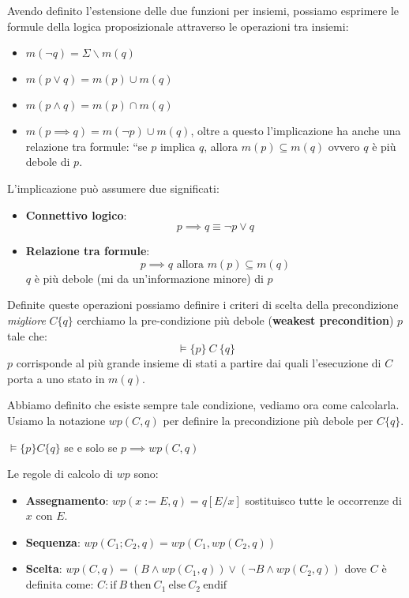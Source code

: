 Avendo definito l'estensione delle due funzioni per insiemi, possiamo esprimere
le formule della logica proposizionale attraverso le operazioni tra insiemi:
\begin{itemize}
    \item $m(\lnot q) = \Sigma \backslash m(q)$
    \item $m(p \lor q) = m(p) \cup m(q)$
    \item $m(p \land q) = m(p) \cap m(q)$
    \item $m(p \implies q) = m(\lnot p) \cup m(q)$, oltre a questo l'implicazione
          ha anche una relazione tra formule: ``se $p$ implica $q$, allora
          $m(p) \subseteq m(q)$ ovvero $q$ è più debole di $p$.
\end{itemize}
\begin{nota}
    L'implicazione può assumere due significati:
    \begin{itemize}
        \item \textbf{Connettivo logico}:
              \begin{equation}
                  p \implies q \equiv \lnot p \lor q
              \end{equation}
        \item \textbf{Relazione tra formule}:
              \begin{equation}
                  p\implies q \text{ allora } m(p)\subseteq m(q)
              \end{equation}
              $q$ è più debole (mi da un'informazione minore) di $p$
    \end{itemize}
\end{nota}
Definite queste operazioni possiamo definire i criteri di scelta della precondizione
\textit{migliore} $C \{q\}$ cerchiamo la pre-condizione più debole
(\textbf{weakest precondition}) $p$ tale che:
\begin{equation}
    \models \{p\} \ C \ \{q\}
\end{equation}
$p$ corrisponde al più grande insieme di stati a partire dai quali l'esecuzione
di $C$ porta a uno stato in $m(q)$.

Abbiamo definito che esiste sempre tale condizione, vediamo ora come calcolarla.
Usiamo la notazione $wp(C, q)$ per definire la precondizione più debole per $C
    \{q\}$.
\begin{teorema}
    $\models \{p\} C \{q\}$ se e solo se $p \implies wp(C, q)$
\end{teorema}
Le regole di calcolo di $wp$ sono:
\begin{itemize}
    \item \textbf{Assegnamento}: $wp(x := E, q) = q[E / x]$ sostituisco tutte le
          occorrenze di $x$ con $E$.
    \item \textbf{Sequenza}: $wp(C_1;C_2, q) = wp(C_1, wp(C_2, q))$
    \item \textbf{Scelta}: $wp(C, q) = (B \land wp(C_1, q)) \lor (\lnot B \land
              wp(C_2, q))$ dove $C$ è definita come: $C: \text{if} \ B \
              \text{then} \ C_1 \ \text{else} \ C_2 \ \text{endif}$
\end{itemize}